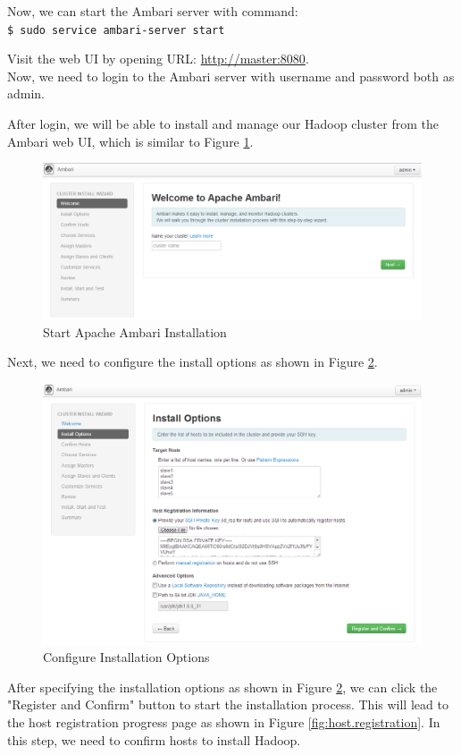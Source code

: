 Now, we can start the Ambari server with command: \\
\verb|$ sudo service ambari-server start|

Visit the web UI by opening URL: \url{http://master:8080}. \\
Now, we need to login to the Ambari server with username and password both as admin.

After login, we will be able to install and manage our Hadoop cluster from the Ambari web UI, which is similar to Figure \ref{fig:ambari.welcome}.
\begin{figure}[ht]
  \centering
  \includegraphics[width=.8\textwidth]{figs/5163os_06_14.png}
  \caption{Start Apache Ambari Installation}\label{fig:ambari.welcome}
\end{figure} 
Next, we need to configure the install options as shown in Figure \ref{fig:ambari.install.options}.
\begin{figure}[ht]
  \centering
  \includegraphics[width=.8\textwidth]{figs/5163os_06_15.png}
  \caption{Configure Installation Options}\label{fig:ambari.install.options}
\end{figure} 
After specifying the installation options as shown in Figure \ref{fig:ambari.install.options}, we can click the "Register and Confirm" button to start the installation process.  This will lead to the host registration progress page as shown in Figure \ref{fig:host.registration}. In this step, we need to confirm hosts to install Hadoop.
